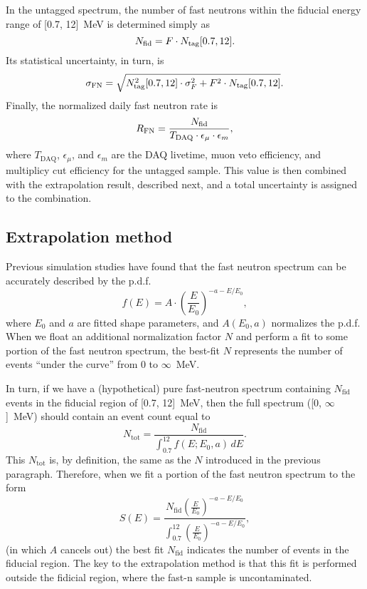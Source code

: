 \documentclass[../thesis.tex]{subfiles}
\begin{document}
In the untagged spectrum, the number of fast neutrons within the fiducial energy range of [0.7, 12]~MeV is determined simply as
\[ N_\mathrm{fid} = F \cdot N_\mathrm{tag}[0.7, 12]. \] Its statistical uncertainty, in turn, is
\begin{equation}
  \label{eq:fastn_scal_unc}
  \sigma_\mathrm{FN} = \sqrt{N_\mathrm{tag}^2[0.7, 12]
    \cdot \sigma_F^2 + F^2 \cdot N_\mathrm{tag}[0.7, 12]}.
\end{equation}
Finally, the normalized daily fast neutron rate is
\begin{equation}
  \label{eq:fastn_rate}
  R_\mathrm{FN} = \frac{N_\mathrm{fid}}{T_\mathrm{DAQ} \cdot \epsilon_\mu \cdot \epsilon_m},
\end{equation}
where $T_\mathrm{DAQ}$, $\epsilon_\mu$, and $\epsilon_m$ are the DAQ livetime, muon veto efficiency, and multiplicy cut efficiency for the untagged sample. This value is then combined with the extrapolation result, described next, and a total uncertainty is assigned to the combination.

\subsection{Extrapolation method}
\label{sec:fastn_extrap}

Previous simulation studies have found that the fast neutron spectrum can be accurately described by the p.d.f.
\[ f(E) = A \cdot \left( \frac{E}{E_0} \right)^{-a-E/E_0}, \] where $E_0$ and $a$ are fitted shape parameters, and $A(E_0, a)$ normalizes the p.d.f. When we float an additional normalization factor $N$ and perform a fit to some portion of the fast neutron spectrum, the best-fit $N$ represents the number of events ``under the curve'' from 0 to $\infty$~MeV.

In turn, if we have a (hypothetical) pure fast-neutron spectrum containing $N_\mathrm{fid}$ events in the fiducial region of [0.7, 12]~MeV, then the full spectrum ([0, $\infty$]~MeV) should contain an event count equal to
\[ N_\mathrm{tot} = \frac{N_\mathrm{fid}}{\int_{0.7}^{12} f(E; E_0, a)\,dE }. \] This $N_\mathrm{tot}$ is, by definition, the same as the $N$ introduced in the previous paragraph. Therefore, when we fit a portion of the fast neutron spectrum to the form
\begin{equation}
  \label{eq:fastn_extrap_form}
  S(E) = \frac{N_\mathrm{fid} \left( \frac{E}{E_0} \right)^{-a-E/E_0}}
  {\int_{0.7}^{12} \left( \frac{E}{E_0} \right)^{-a-E/E_0} },
\end{equation}
(in which $A$ cancels out) the best fit $N_\mathrm{fid}$ indicates the number of events in the fiducial region. The key to the extrapolation method is that this fit is performed outside the fidicial region, where the fast-n sample is uncontaminated.
\end{document}

